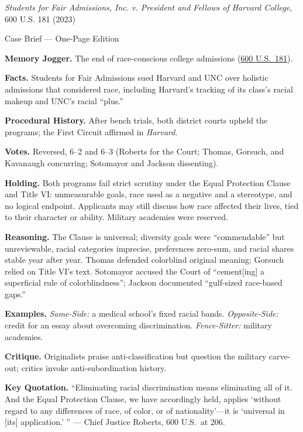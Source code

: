 \documentclass[12pt]{article}
\begin{document}
\begin{center}
{\Large \textit{Students for Fair Admissions, Inc. v. President and Fellows of Harvard College}, 600 U.S. 181 (2023)\par}
\vspace{0.3em}
{\normalsize Case Brief --- One-Page Edition\par}
\end{center}

\textbf{Memory Jogger.} The end of race-conscious college admissions (\href{https://www.law.cornell.edu/supremecourt/text/20-1199}{600 U.S.\ 181}).

\textbf{Facts.} Students for Fair Admissions sued Harvard and UNC over holistic admissions that considered race, including Harvard's tracking of its class's racial makeup and UNC's racial ``plus.''

\textbf{Procedural History.} After bench trials, both district courts upheld the programs; the First Circuit affirmed in \textit{Harvard}.

\textbf{Votes.} Reversed, 6--2 and 6--3 (Roberts for the Court; Thomas, Gorsuch, and Kavanaugh concurring; Sotomayor and Jackson dissenting).

\textbf{Holding.} Both programs fail strict scrutiny under the Equal Protection Clause and Title VI: unmeasurable goals, race used as a negative and a stereotype, and no logical endpoint. Applicants may still discuss how race affected their lives, tied to their character or ability. Military academies were reserved.

\textbf{Reasoning.} The Clause is universal; diversity goals were ``commendable'' but unreviewable, racial categories imprecise, preferences zero-sum, and racial shares stable year after year. Thomas defended colorblind original meaning; Gorsuch relied on Title VI's text. Sotomayor accused the Court of ``cement[ing] a superficial rule of colorblindness''; Jackson documented ``gulf-sized race-based gaps.''

\textbf{Examples.} \emph{Same-Side:} a medical school's fixed racial bands. \emph{Opposite-Side:} credit for an essay about overcoming discrimination. \emph{Fence-Sitter:} military academies.

\textbf{Critique.} Originalists praise anti-classification but question the military carve-out; critics invoke anti-subordination history.

\textbf{Key Quotation.} ``Eliminating racial discrimination means eliminating all of it. And the Equal Protection Clause, we have accordingly held, applies `without regard to any differences of race, of color, or of nationality'---it is `universal in [its] application.' '' --- Chief Justice Roberts, 600 U.S.\ at 206.
\end{document}
